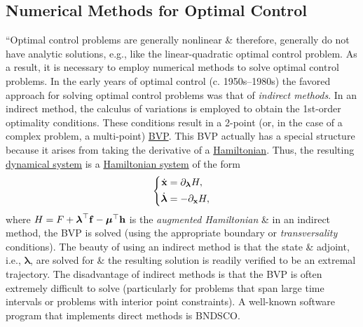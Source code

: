 \documentclass{article}
\begin{document}
\subsection{Numerical Methods for Optimal Control}
``Optimal control problems are generally nonlinear \& therefore, generally do not have analytic solutions, e.g., like the linear-quadratic optimal control problem. As a result, it is necessary to employ numerical methods to solve optimal control problems. In the early years of optimal control (c. 1950s--1980s) the favored approach for solving optimal control problems was that of {\it indirect methods}. In an indirect method, the calculus of variations is employed to obtain the 1st-order optimality conditions. These conditions result in a 2-point (or, in the case of a complex problem, a multi-point) \href{https://en.wikipedia.org/wiki/Boundary-value_problem}{BVP}. This BVP actually has a special structure because it arises from taking the derivative of a \href{https://en.wikipedia.org/wiki/Hamiltonian_(control_theory)}{Hamiltonian}. Thus, the resulting \href{https://en.wikipedia.org/wiki/Dynamical_system}{dynamical system} is a \href{https://en.wikipedia.org/wiki/Hamiltonian_system}{Hamiltonian system} of the form
\begin{equation}
	\left\{\begin{split}
		\dot{\bf x} &= \partial_{\boldsymbol{\lambda}}H,\\
		\dot{\boldsymbol{\lambda}} &= -\partial_{\bf x}H,
	\end{split}\right.
\end{equation}
where $H = F + \boldsymbol{\lambda}^\top{\bf f} - \boldsymbol{\mu}^\top{\bf h}$ is the {\it augmented Hamiltonian} \& in an indirect method, the BVP is solved (using the appropriate boundary or {\it transversality} conditions). The beauty of using an indirect method is that the state \& adjoint, i.e., $\boldsymbol{\lambda}$, are solved for \& the resulting solution is readily verified to be an extremal trajectory. The disadvantage of indirect methods is that the BVP is often extremely difficult to solve (particularly for problems that span large time intervals or problems with interior point constraints). A well-known software program that implements direct methods is BNDSCO.
\end{document}
